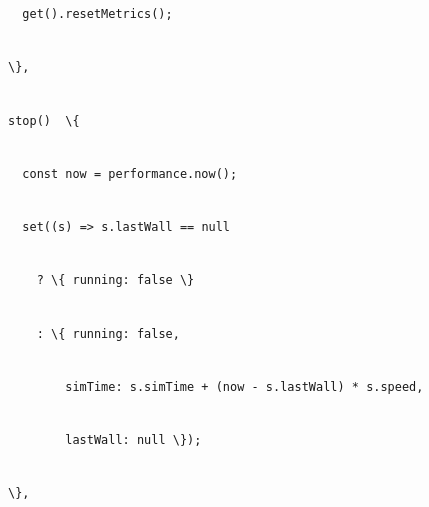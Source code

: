 \documentclass[
]{article}
\newcommand{\passthrough}[1]{#1}
\begin{document}
\passthrough{\lstinline!  !}\passthrough{\lstinline!get().!}\passthrough{\lstinline!resetMetrics!}\passthrough{\lstinline!();!}\strut \\
\passthrough{\lstinline!\},!}\strut \\
\passthrough{\lstinline!stop()!}\passthrough{\lstinline!  !}\passthrough{\lstinline!\{!}\strut \\
\passthrough{\lstinline!  !}\passthrough{\lstinline!const!}\passthrough{\lstinline! !}\passthrough{\lstinline!now!}\passthrough{\lstinline! !}\passthrough{\lstinline!=!}\passthrough{\lstinline! !}\passthrough{\lstinline!performance.now!}\passthrough{\lstinline!();!}\strut \\
\passthrough{\lstinline!  !}\passthrough{\lstinline!set((s)!}\passthrough{\lstinline! !}\passthrough{\lstinline!=>!}\passthrough{\lstinline! !}\passthrough{\lstinline!s.lastWall!}\passthrough{\lstinline! !}\passthrough{\lstinline!==!}\passthrough{\lstinline! !}\passthrough{\lstinline!null!}\strut \\
\passthrough{\lstinline!    !}\passthrough{\lstinline!?!}\passthrough{\lstinline! !}\passthrough{\lstinline!\{!}\passthrough{\lstinline! !}\passthrough{\lstinline!running:!}\passthrough{\lstinline! !}\passthrough{\lstinline!false!}\passthrough{\lstinline! !}\passthrough{\lstinline!\}!}\strut \\
\passthrough{\lstinline!    !}\passthrough{\lstinline!:!}\passthrough{\lstinline! !}\passthrough{\lstinline!\{!}\passthrough{\lstinline! !}\passthrough{\lstinline!running:!}\passthrough{\lstinline! !}\passthrough{\lstinline!false,!}\strut \\
\passthrough{\lstinline!        !}\passthrough{\lstinline!simTime!}\passthrough{\lstinline!:!}\passthrough{\lstinline! !}\passthrough{\lstinline!s.simTime!}\passthrough{\lstinline! !}\passthrough{\lstinline!+!}\passthrough{\lstinline! !}\passthrough{\lstinline!(now!}\passthrough{\lstinline! !}\passthrough{\lstinline!-!}\passthrough{\lstinline! !}\passthrough{\lstinline!s.lastWall!}\passthrough{\lstinline!)!}\passthrough{\lstinline! !}\passthrough{\lstinline!*!}\passthrough{\lstinline! !}\passthrough{\lstinline!s.speed!}\passthrough{\lstinline!,!}\strut \\
\passthrough{\lstinline!        !}\passthrough{\lstinline!lastWall!}\passthrough{\lstinline!:!}\passthrough{\lstinline! !}\passthrough{\lstinline!null!}\passthrough{\lstinline! !}\passthrough{\lstinline!\});!}\strut \\
\passthrough{\lstinline!\},!}\strut \\
\end{document}
